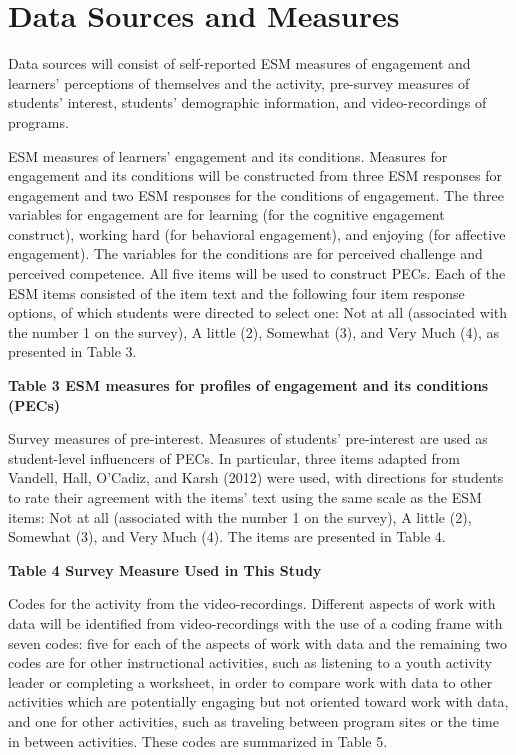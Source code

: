 \documentclass[]{book}
\theoremstyle{definition}
\theoremstyle{definition}
\theoremstyle{definition}
\theoremstyle{remark}
\begin{document}
\section{Data Sources and Measures}\label{data-sources-and-measures}

Data sources will consist of self-reported ESM measures of engagement
and learners' perceptions of themselves and the activity, pre-survey
measures of students' interest, students' demographic information, and
video-recordings of programs.

ESM measures of learners' engagement and its conditions. Measures for
engagement and its conditions will be constructed from three ESM
responses for engagement and two ESM responses for the conditions of
engagement. The three variables for engagement are for learning (for the
cognitive engagement construct), working hard (for behavioral
engagement), and enjoying (for affective engagement). The variables for
the conditions are for perceived challenge and perceived competence. All
five items will be used to construct PECs. Each of the ESM items
consisted of the item text and the following four item response options,
of which students were directed to select one: Not at all (associated
with the number 1 on the survey), A little (2), Somewhat (3), and Very
Much (4), as presented in Table 3.

\textbf{Table 3 ESM measures for profiles of engagement and its
conditions (PECs)}

Survey measures of pre-interest. Measures of students' pre-interest are
used as student-level influencers of PECs. In particular, three items
adapted from Vandell, Hall, O'Cadiz, and Karsh (2012) were used, with
directions for students to rate their agreement with the items' text
using the same scale as the ESM items: Not at all (associated with the
number 1 on the survey), A little (2), Somewhat (3), and Very Much (4).
The items are presented in Table 4.

\textbf{Table 4 Survey Measure Used in This Study}

Codes for the activity from the video-recordings. Different aspects of
work with data will be identified from video-recordings with the use of
a coding frame with seven codes: five for each of the aspects of work
with data and the remaining two codes are for other instructional
activities, such as listening to a youth activity leader or completing a
worksheet, in order to compare work with data to other activities which
are potentially engaging but not oriented toward work with data, and one
for other activities, such as traveling between program sites or the
time in between activities. These codes are summarized in Table 5.
\end{document}
